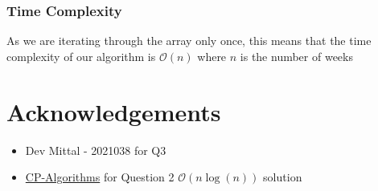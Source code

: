 \documentclass[12pt]{article}
\begin{document}
\subsubsection{Time Complexity}

As we are iterating through the array only once, this means that the time complexity of our algorithm is $\mathcal{O}(n)$ where $n$ is the number of weeks 


\section{Acknowledgements}

\begin{itemize}
    \item Dev Mittal - 2021038 for Q3
    \item \href{https://cp-algorithms.com/sequences/longest_increasing_subsequence.html#solution-in-on-log-n-with-dynamic-programming-and-binary-search}{CP-Algorithms} for Question 2 $\mathcal{O}(n\log(n))$ solution
\end{itemize}
\end{document}
